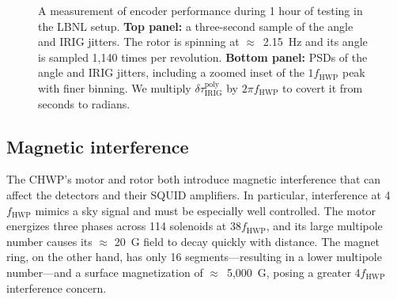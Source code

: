 \begin{figure}[!t]
    \centering
    \caption{A measurement of encoder performance during 1 hour of testing in the LBNL setup. \textbf{Top panel:} a three-second sample of the angle and IRIG jitters. The rotor is spinning at $\approx$~2.15~Hz and its angle is sampled 1,140 times per revolution. \textbf{Bottom panel:} PSDs of the angle and IRIG jitters, including a zoomed inset of the $1 f_{\mathrm{HWP}}$ peak with finer binning. We multiply $\delta \tau_{\mathrm{IRIG}}^{\mathrm{poly}}$ by $2 \pi f_{\mathrm{HWP}}$ to covert it from seconds to radians.}
    \label{fig:jitter_psd}
\end{figure}


\subsection{Magnetic interference}
\label{sec:pb2b_chwp_evaluation_magnetic_interference}

The CHWP's motor and rotor both introduce magnetic interference that can affect the detectors and their SQUID amplifiers. In particular, interference at 4$f_{\mathrm{HWP}}$ mimics a sky signal and must be especially well controlled. The motor energizes three phases across 114 solenoids at 38$f_{\mathrm{HWP}}$, and its large multipole number causes its $\approx$ 20~G field to decay quickly with distance. The magnet ring, on the other hand, has only 16 segments---resulting in a lower multipole number---and a surface magnetization of $\approx$~5,000~G, posing a greater 4$f_{\mathrm{HWP}}$ interference concern. 

